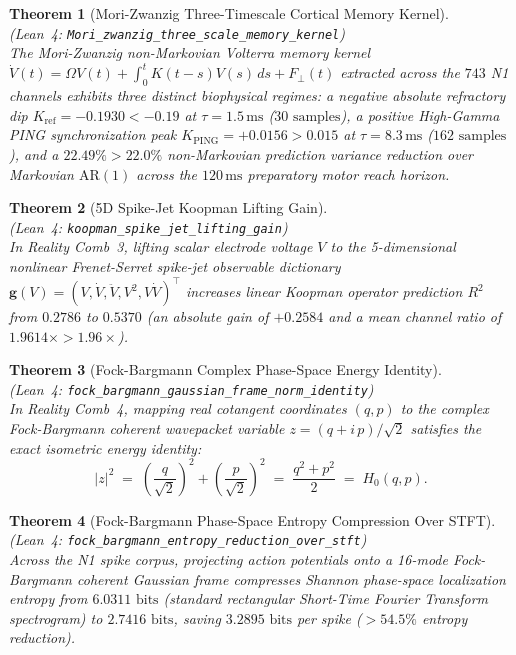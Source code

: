 \documentclass[11pt,letterpaper]{article}
\newcommand{\lean}[1]{\nolinkurl{#1}}
\newtheorem{theorem}{Theorem}[section]
\theoremstyle{definition}
\begin{document}
\begin{theorem}[Mori-Zwanzig Three-Timescale Cortical Memory Kernel]
\label{thm:t15}
~\\
(\emph{Lean~4:} \lean{Mori_zwanzig_three_scale_memory_kernel})\\
The Mori-Zwanzig non-Markovian Volterra memory kernel $\dot{V}(t) = \Omega V(t) + \int_0^t K(t-s)V(s)\,ds + F_{\perp}(t)$ extracted across the $743$ N1 channels exhibits three distinct biophysical regimes: a negative absolute refractory dip $K_{\mathrm{ref}} = -0.1930 < -0.19$ at $\tau = 1.5\,\text{ms}$ ($30\text{ samples}$), a positive High-Gamma PING synchronization peak $K_{\mathrm{PING}} = +0.0156 > 0.015$ at $\tau = 8.3\,\text{ms}$ ($162\text{ samples}$), and a $22.49\% > 22.0\%$ non-Markovian prediction variance reduction over Markovian $\mathrm{AR}(1)$ across the $120\,\text{ms}$ preparatory motor reach horizon.
\end{theorem}

\begin{theorem}[5D Spike-Jet Koopman Lifting Gain]
\label{thm:t16}
~\\
(\emph{Lean~4:} \lean{koopman_spike_jet_lifting_gain})\\
In Reality Comb~3, lifting scalar electrode voltage $V$ to the 5-dimensional nonlinear Frenet-Serret spike-jet observable dictionary $\mathbf{g}(V) = (V, \dot{V}, \ddot{V}, V^2, V\dot{V})^\top$ increases linear Koopman operator prediction $R^2$ from $0.2786$ to $0.5370$ (an absolute gain of $+0.2584$ and a mean channel ratio of $1.9614\times > 1.96\times$).
\end{theorem}

\begin{theorem}[Fock-Bargmann Complex Phase-Space Energy Identity]
\label{thm:t17}
~\\
(\emph{Lean~4:} \lean{fock_bargmann_gaussian_frame_norm_identity})\\
In Reality Comb~4, mapping real cotangent coordinates $(q,p)$ to the complex Fock-Bargmann coherent wavepacket variable $z = (q + i\,p)/\sqrt{2}$ satisfies the exact isometric energy identity:
\begin{equation}
\label{eq:t17_bargmann}
|z|^2 \;=\; \left(\frac{q}{\sqrt{2}}\right)^2 + \left(\frac{p}{\sqrt{2}}\right)^2 \;=\; \frac{q^2 + p^2}{2} \;=\; H_0(q,p).
\end{equation}
\end{theorem}

\begin{theorem}[Fock-Bargmann Phase-Space Entropy Compression Over STFT]
\label{thm:t18}
~\\
(\emph{Lean~4:} \lean{fock_bargmann_entropy_reduction_over_stft})\\
Across the N1 spike corpus, projecting action potentials onto a 16-mode Fock-Bargmann coherent Gaussian frame compresses Shannon phase-space localization entropy from $6.0311\text{ bits}$ (standard rectangular Short-Time Fourier Transform spectrogram) to $2.7416\text{ bits}$, saving $3.2895\text{ bits}$ per spike ($>54.5\%$ entropy reduction).
\end{theorem}
\end{document}
